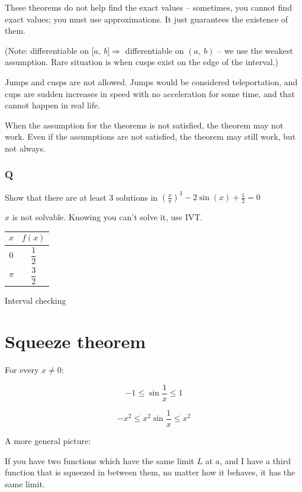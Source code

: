 \documentclass[12pt]{article}
\theoremstyle{plain}
\theoremstyle{remark}
\theoremstyle{definition}
\begin{document}
These theorems do not help find the exact values -- sometimes, you
cannot find exact values; you must use approximations. It just
guarantees the existence of them.

(Note: differentiable on \(\lbrack a,\ b\rbrack \Rightarrow\)
differentiable on \((a,\ b)\) -- we use the weakest assumption. Rare
situation is when cusps exist on the edge of the interval.)

Jumps and cusps are not allowed. Jumps would be considered
teleportation, and cups are sudden increases in speed with no
acceleration for some time, and that cannot happen in real life.

When the assumption for the theorems is not satisfied, the theorem may
not work. Even if the assumptions are not satisfied, the theorem may
still work, but not always.


\subsubsection{Q}

Show that there are at least 3 solutions in
\(\left( \frac{x}{\pi} \right)^{3} - 2\sin(x) + \frac{1}{2} = 0\)

\(x\) is not solvable. Knowing you can't solve it, use IVT.

\begin{table}[H]
\centering


\begin{tabular}{|m{17em}|m{17em}|}

\hline
\[x\]& \[f(x)\]\\ \hline
\[0\] & \[\frac{1}{2}\] \\ \hline
\[\pi\] & \[\frac{3}{2}\]
\\\hline
\end{tabular}

\end{table}
Interval checking


\section{Squeeze theorem}

For every \(x \neq 0\):

\[- 1 \leq \sin\frac{1}{x} \leq 1\]

\[- x^{2} \leq x^{2}\sin\frac{1}{x} \leq x^{2}\]

A more general picture:

If you have two functions which have the same limit \(L\) at \(a\), and
I have a third function that is squeezed in between them, no matter how
it behaves, it has the same limit.
\end{document}
